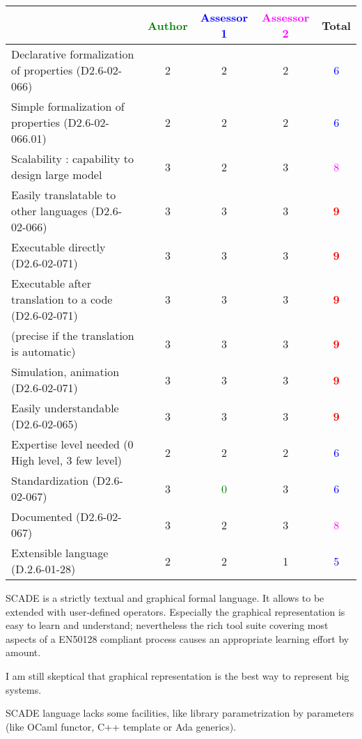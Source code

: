 \begin{tabular}{|l | c | c | c | c|}
\hline
& \textcolor{green}{Author} & \textcolor{blue}{Assessor 1} & \textcolor{magenta}{Assessor 2} & Total \\
\hline
Declarative formalization of properties (D2.6-02-066) &
2  & 2     &2 & \textcolor{blue}{6} \\
\hline
Simple formalization of properties (D2.6-02-066.01) &
2 & 2     &2 & \textcolor{blue}{6} \\
\hline
Scalability : capability to design large model &  3
& 2     &3 & \textcolor{magenta}{8} \\
\hline
Easily translatable to other languages (D2.6-02-066) &
3  & 3     &3 & \textcolor{red}{\textbf{9}} \\
\hline
Executable directly (D2.6-02-071) & 3      & 3     &3 & \textcolor{red}{\textbf{9}} \\
\hline
Executable after translation to a code (D2.6-02-071) &
3& 3     &3 & \textcolor{red}{\textbf{9}} \\
(precise if the translation is automatic) &  3& 3     &3 & \textcolor{red}{\textbf{9}} \\
\hline
Simulation, animation (D2.6-02-071) &  3 & 3     &3 & \textcolor{red}{\textbf{9}} \\
\hline
Easily understandable (D2.6-02-065) &  3& 3     &3 & \textcolor{red}{\textbf{9}} \\
\hline
Expertise level needed (0 High level, 3 few level) &
2 & 2     &2 & \textcolor{blue}{6} \\
\hline
Standardization (D2.6-02-067) &  3& \textcolor{green}{0} &3 & \textcolor{blue}{6} \\
\hline
Documented (D2.6-02-067) &  3 & 2     &3 & \textcolor{magenta}{8} \\
\hline
Extensible language (D.2.6-01-28) &  2& 2     &1 & \textcolor{blue}{5} \\
\hline
\end{tabular}
\begin{author_comment}
SCADE is a strictly textual and graphical formal language. It allows to be extended with user-defined operators. Especially the graphical representation is easy to learn and understand; nevertheless the rich tool suite covering most aspects of a EN50128 compliant process causes an appropriate learning effort by amount.
\end{author_comment}


\begin{assessor1}
  I am still skeptical that graphical representation is the best way
  to represent big systems.

  SCADE language lacks some facilities, like library parametrization
  by parameters (like OCaml functor, C++ template or Ada generics).
\end{assessor1}

